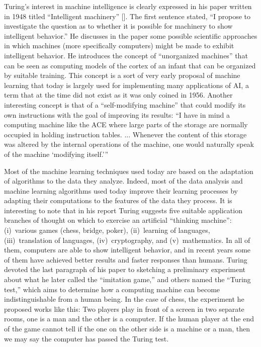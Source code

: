Turing's interest in machine intelligence is clearly expressed in his paper written in 1948 titled ``Intelligent machinery'' [\citealt{chap:4:Turing:1969}]. The first sentence stated, ``I propose to investigate the question as to whether it is possible for machinery to show intelligent behavior.'' He discusses in the paper some possible scientific approaches in which machines (more specifically computers) might be made to exhibit intelligent behavior. He introduces the concept of ``unorganized machines'' that can be seen as computing models of the cortex of an infant that can be organized by suitable training. This concept is a sort of very early proposal of machine learning that today is largely used for implementing many applications of AI, a term that at the time did not exist as it was only coined in 1956. Another interesting concept is that of a ``self-modifying machine'' that could modify its own instructions with the goal of improving its results: ``I have in mind a computing machine like the ACE where large parts of the storage are normally occupied in holding instruction tables. ... Whenever the content of this storage was altered by the internal operations of the machine, one would naturally speak of the machine {\textquoteleft}modifying itself.{\textquoteright}''

Most of the machine learning techniques used today are based on the adaptation of algorithms to the data they analyze. Indeed, most of the data analysis and machine learning algorithms used today improve their learning processes by adapting their computations to the features of the data they process. It is interesting to note that in his report Turing suggests five suitable application branches of thought on which to exercise an artificial ``thinking machine'': (i)~various games (chess, bridge, poker), (ii)~learning of languages, (iii)~translation of languages, (iv)~cryptography, and (v)~mathematics. In all of them, computers are able to show intelligent behavior, and in recent years some of them have achieved better results and faster responses than humans. Turing devoted the last paragraph of his paper to sketching a preliminary experiment about what he later called the ``imitation game,'' and others named the ``Turing test,'' which aims to determine how a computing machine can become indistinguishable from a human being. In the case of chess, the experiment he proposed works like this: Two players play in front of a screen in two separate rooms, one is a man and the other is a computer. If the human player at the end of the game cannot tell if the one on the other side is a machine or a man, then we may say the computer has passed the Turing test.

